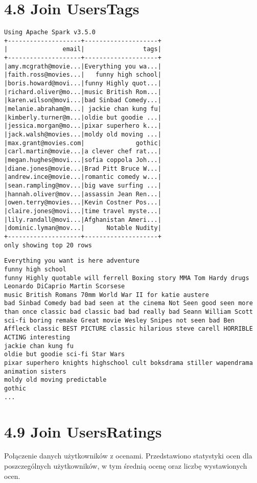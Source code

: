 \documentclass{article}
\begin{document}
\section{4.8 Join UsersTags}
\begin{verbatim}
Using Apache Spark v3.5.0
+--------------------+--------------------+
|               email|                tags|
+--------------------+--------------------+
|amy.mcgrath@movie...|Everything you wa...|
|faith.ross@movies...|   funny high school|
|boris.howard@movi...|funny Highly quot...|
|richard.oliver@mo...|music British Rom...|
|karen.wilson@movi...|bad Sinbad Comedy...|
|melanie.abraham@m...| jackie chan kung fu|
|kimberly.turner@m...|oldie but goodie ...|
|jessica.morgan@mo...|pixar superhero k...|
|jack.walsh@movies...|moldy old moving ...|
|max.grant@movies.com|              gothic|
|carl.martin@movie...|a clever chef rat...|
|megan.hughes@movi...|sofia coppola Joh...|
|diane.jones@movie...|Brad Pitt Bruce W...|
|andrew.ince@movie...|romantic comedy w...|
|sean.rampling@mov...|big wave surfing ...|
|hannah.oliver@mov...|assassin Jean Ren...|
|owen.terry@movies...|Kevin Costner Pos...|
|claire.jones@movi...|time travel myste...|
|lily.randall@movi...|Afghanistan Ameri...|
|dominic.lyman@mov...|      Notable Nudity|
+--------------------+--------------------+
only showing top 20 rows
\end{verbatim}

\begin{verbatim}
Everything you want is here adventure
funny high school
funny Highly quotable will ferrell Boxing story MMA Tom Hardy drugs Leonardo DiCaprio Martin Scorsese
music British Romans 70mm World War II for katie austere
bad Sinbad Comedy bad bad seen at the cinema Not Seen good seen more than once classic bad classic bad bad really bad Seann William Scott sci-fi boring remake Great movie Wesley Snipes not seen bad Ben Affleck classic BEST PICTURE classic hilarious steve carell HORRIBLE ACTING interesting
jackie chan kung fu
oldie but goodie sci-fi Star Wars
pixar superhero knights highschool cult boksdrama stiller wapendrama animation sisters
moldy old moving predictable
gothic
...
\end{verbatim}

\section{4.9 Join UsersRatings}
Połączenie danych użytkowników z ocenami. Przedstawiono statystyki ocen dla poszczególnych użytkowników, w tym średnią ocenę oraz liczbę wystawionych ocen.
\end{document}
